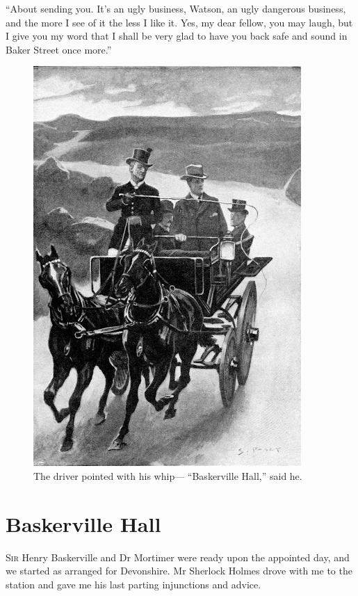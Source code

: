 \documentclass[paper=a5,BCOR=7mm,twoside,DIV=calc,12pt,usegeometry,openany,chapterprefix,endperiod,headings=big]{scrbook} %
\begin{document}
\enquote{About sending you. It's an ugly business, Watson, an ugly dangerous business, and the more I see of it the less I like it. Yes, my dear fellow, you may laugh, but I give you my word that I shall be very glad to have you back safe and sound in Baker Street once more.}
\clearpage
\vfill
\begin{figure}[hp!]
\centering
\includegraphics[width=\textwidth]{06_driverwhip}
\caption{The driver pointed with his whip--- \enquote{Baskerville Hall,} said he.}
\end{figure}
\vfill
\thispagestyle{empty}
\clearpage

\chapter{Baskerville Hall}
\lettrine[lines=1]{S}{ir} Henry Baskerville and Dr Mortimer were ready upon the appointed day, and we started as arranged for Devonshire. Mr Sherlock Holmes drove with me to the station and gave me his last parting injunctions and advice.
\end{document}
